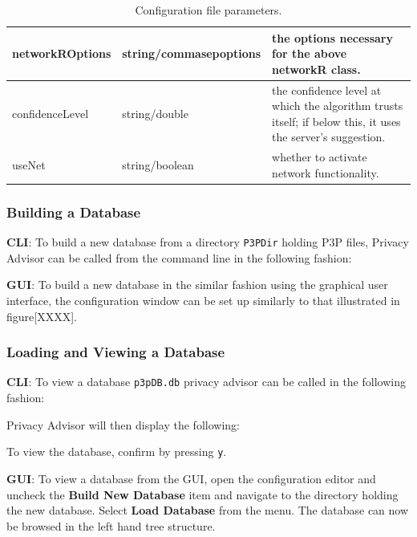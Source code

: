 \begin{center}
\begin{table}[h!]
\begin{tabular} { | l | l | p{7cm} | }
      networkROptions & string/commasepoptions	& the options necessary for the above networkR class. \\ \hline
      confidenceLevel & string/double & the confidence level at which the algorithm trusts itself; if below this, it uses the server's suggestion. \\ \hline
      useNet & string/boolean & whether to activate network functionality. \\ \hline
      \hline
    \end{tabular}
    \caption{Configuration file parameters.}
  \end{table}
\end{center}

\subsubsection{Building a Database}

\textbf{CLI}: To build a new database from a directory \texttt{P3PDir} holding P3P files, Privacy
Advisor can be called from the command line in the following fashion:


\textbf{GUI}: To build a new database in the similar fashion using the
graphical user interface, the configuration window can be set up
similarly to that illustrated in figure[XXXX].

\subsubsection{Loading and Viewing a Database}

\textbf{CLI}: To view a database \texttt{p3pDB.db} privacy advisor can be called in the following fashion:


Privacy Advisor will then display the following:


To view the database, confirm by pressing \texttt{y}.

\textbf{GUI}: To view a database from the GUI, open the configuration editor and uncheck the \textbf{Build New Database} item and 
navigate to the directory holding the new database. Select \textbf{Load Database} from the menu. The database can now be browsed in
the left hand tree structure.